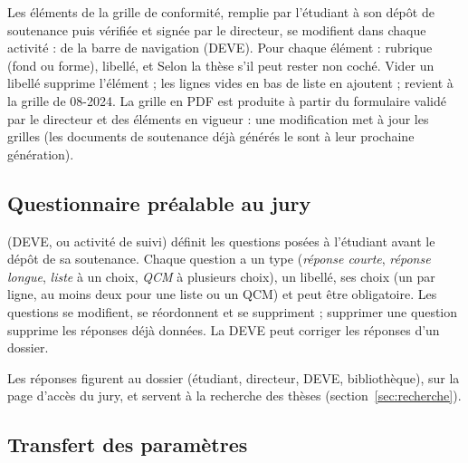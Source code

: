 \documentclass[11pt,a4paper]{article}
\begin{document}
Les éléments de la grille de conformité, remplie par l'étudiant à son dépôt de
soutenance puis vérifiée et signée par le directeur, se modifient
dans chaque activité :  de la barre de navigation
(DEVE). Pour chaque élément : rubrique (fond ou forme), libellé, et \og Selon la
thèse\fg{} s'il peut rester non coché. Vider un libellé supprime l'élément ; les
lignes vides en bas de liste en ajoutent ; 
revient à la grille de 08-2024. La grille en PDF est produite à partir du
formulaire validé par le directeur et des éléments en vigueur : une
modification met à jour les grilles (les documents de soutenance déjà générés
le sont à leur prochaine génération).


\subsection{Questionnaire préalable au jury}\label{sec:questionnaire}

 (DEVE, ou activité de suivi) définit
les questions posées à l'étudiant avant le dépôt de sa soutenance. Chaque
question a un type (\emph{réponse courte}, \emph{réponse longue}, \emph{liste}
à un choix, \emph{QCM} à plusieurs choix), un libellé, ses choix (un par ligne,
au moins deux pour une liste ou un QCM) et peut être obligatoire. Les questions
se modifient, se réordonnent et se suppriment ; supprimer une question supprime
les réponses déjà données. La DEVE peut corriger les réponses d'un dossier.


Les réponses figurent au dossier (étudiant, directeur, DEVE, bibliothèque), sur
la page d'accès du jury, et servent à la recherche des thèses
(section~\ref{sec:recherche}).

\subsection{Transfert des paramètres}\label{sec:transfert}
\end{document}
